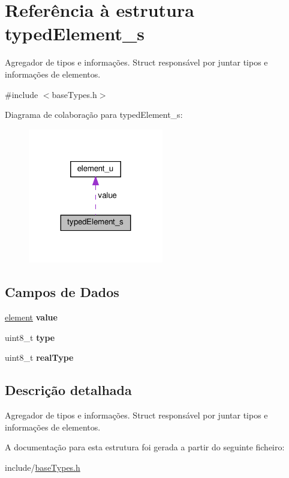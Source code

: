 \hypertarget{structtypedElement__s}{}\section{Referência à estrutura typed\+Element\+\_\+s}
\label{structtypedElement__s}


Agregador de tipos e informações. Struct responsável por juntar tipos e informações de elementos.  




{\ttfamily \#include $<$base\+Types.\+h$>$}



Diagrama de colaboração para typed\+Element\+\_\+s\+:
\nopagebreak
\begin{figure}[H]
\begin{center}
\leavevmode
\includegraphics[width=167pt]{structtypedElement__s__coll__graph}
\end{center}
\end{figure}
\subsection*{Campos de Dados}
\begin{DoxyCompactItemize}
\item 
\mbox{\label{structtypedElement__s_a579b7dd61dd13e2a1d37035d3758a2dc}} 
\hyperlink{unionelement__u}{element} {\bfseries value}
\item 
\mbox{\label{structtypedElement__s_a725ddec1b2a04b6488cdde81f3e0255e}} 
uint8\+\_\+t {\bfseries type}
\item 
\mbox{\label{structtypedElement__s_a265d7ad822f91bfa8fd6eb292e2d20d8}} 
uint8\+\_\+t {\bfseries real\+Type}
\end{DoxyCompactItemize}


\subsection{Descrição detalhada}
Agregador de tipos e informações. Struct responsável por juntar tipos e informações de elementos. 

A documentação para esta estrutura foi gerada a partir do seguinte ficheiro\+:\begin{DoxyCompactItemize}
\item 
include/\hyperlink{baseTypes_8h}{base\+Types.\+h}\end{DoxyCompactItemize}
